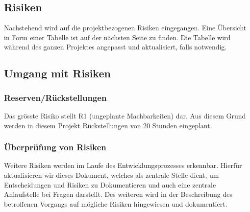 	\subsection*{Risiken}
		Nachstehend wird auf die projektbezogenen Risiken eingegangen. Eine Übersicht in Form einer Tabelle ist 
		auf der nächsten Seite zu finden. Die Tabelle wird während des ganzen Projektes angepasst und aktualisiert, falls notwendig.

	\subsection*{Umgang mit Risiken}
		\subsubsection*{Reserven/Rückstellungen}
			Das grösste Risiko stellt R1 (ungeplante Machbarkeiten) dar. Aus diesem Grund werden in diesem Projekt Rückstellungen von 20 Stunden eingeplant.

		\subsubsection*{Überprüfung von Risiken}
			Weitere Risiken werden im Laufe des Entwicklungsprozesses erkennbar. Hierfür aktualisieren wir dieses Dokument, welches als zentrale Stelle dient, 
			um Entscheidungen und Risiken zu Dokumentieren und auch eine zentrale Anlaufstelle bei Fragen darstellt. Des weiteren wird in der Beschreibung des 
			betroffenen Vorgangs auf mögliche Risiken hingewiesen und dokumentiert.
\pagebreak
	
